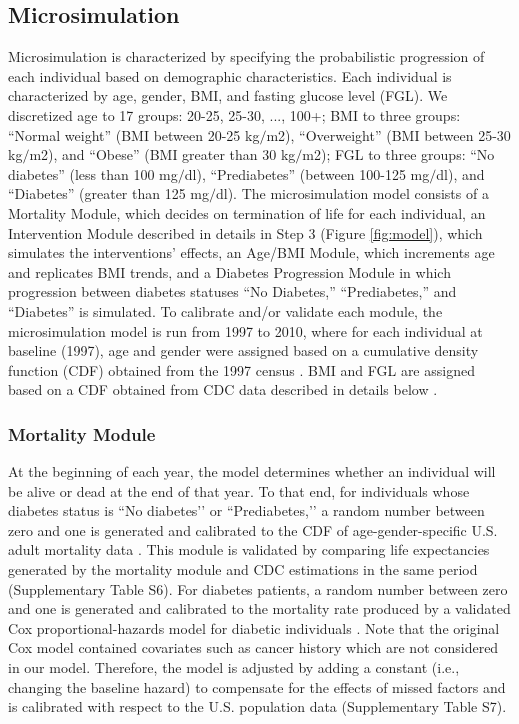 \documentclass[fleqn,10pt]{wlscirep}
\begin{document}
\subsection*{Microsimulation}
Microsimulation is characterized by specifying the probabilistic progression of each individual based on demographic characteristics. Each individual is characterized by age, gender, BMI, and fasting glucose level (FGL). We discretized age to 17 groups: 20-25, 25-30, ..., 100+; BMI to three groups: ``Normal weight'' (BMI between 20-25 kg$/$m2), ``Overweight'' (BMI between 25-30 kg$/$m2), and ``Obese'' (BMI greater than 30 kg$/$m2); FGL to three groups: ``No diabetes'' (less than 100 mg$/$dl), ``Prediabetes'' (between 100-125 mg$/$dl), and ``Diabetes'' (greater than 125 mg$/$dl). 
The microsimulation model consists of a Mortality Module, which decides on termination of life for each individual, an Intervention Module described in details in Step 3 (Figure \ref{fig:model}), which simulates the interventions’ effects, an Age/BMI Module, which increments age and replicates BMI trends, and a Diabetes Progression Module in which progression between diabetes statuses ``No Diabetes,''  ``Prediabetes,'' and ``Diabetes'' is simulated. 
To calibrate and/or validate each module, the microsimulation model is run from 1997 to 2010, where for each individual at baseline (1997), age and gender were assigned based on a cumulative density function (CDF) obtained from the 1997 census \cite{u.s.:census:bureau:resident:2001}. BMI and FGL are assigned based on a CDF obtained from CDC data described in details below \cite{schoenborn:body:2002,centers:for:disease:control:and:prevention:rates:2015}.

\subsubsection*{Mortality Module}
At the beginning of each year, the model determines whether an individual will be alive or dead at the end of that year. To that end, for individuals whose diabetes status is ``No diabetes’’ or ``Prediabetes,’’ a random number between zero and one is generated and calibrated to the CDF of age-gender-specific U.S. adult mortality data \cite{anderson:united:1999}. This module is validated by comparing life expectancies generated by the mortality module and CDC estimations in the same period (Supplementary Table S6). For diabetes patients, a random number between zero and one is generated and calibrated to the mortality rate produced by a validated Cox proportional-hazards model for diabetic individuals \cite{yang:development:2008}. Note that the original Cox model contained covariates such as cancer history which are not considered in our model. Therefore, the model is adjusted by adding a constant (i.e., changing the baseline hazard) to compensate for the effects of missed factors and is calibrated with respect to the U.S. population data \cite{narayan:lifetime:2003} (Supplementary Table S7).
\end{document}
